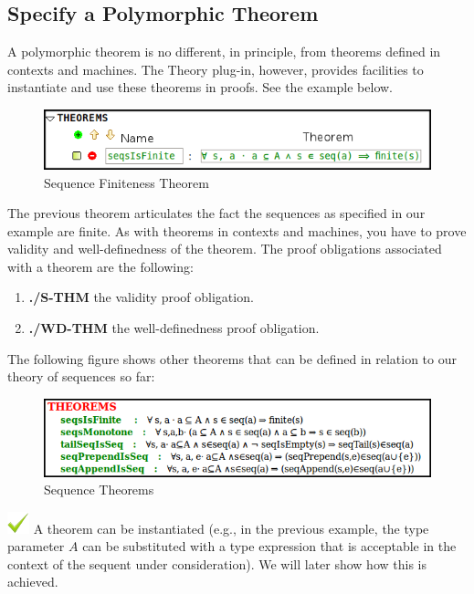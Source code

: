 \subsection{Specify a Polymorphic Theorem}
A polymorphic theorem is no different, in principle, from theorems defined in contexts and machines. The Theory plug-in, however, provides facilities to instantiate and use these theorems in proofs. See the example below.

\begin{center}
\begin{figure}
\label{theoremEx}
\includegraphics{images/Theorem.png}
\caption{Sequence Finiteness Theorem}
\end{figure}
\end{center}

\par 
The previous theorem articulates the fact the sequences as specified in our example are finite. As with theorems in contexts and machines, you have to prove validity and well-definedness of the theorem. The proof obligations associated with a theorem are the following:

\begin{enumerate}
	\item \textbf{./S-THM} the validity proof obligation.
	\item \textbf{./WD-THM} the well-definedness proof obligation.
\end{enumerate}

The following figure shows other theorems that can be defined in relation to our theory of sequences so far:

\begin{center}
\begin{figure}
\label{theoremsEx}
\includegraphics{images/Theorems.png}
\caption{Sequence Theorems}
\end{figure}
\end{center}

\includegraphics{images/nike.png} A theorem can be instantiated (e.g., in the previous example, the type parameter $A$ can be substituted with a type expression that is acceptable in the context of the sequent under consideration). We will later show how this is achieved.

